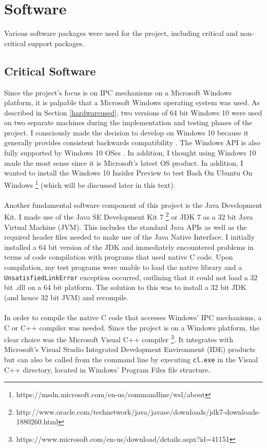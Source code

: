 \documentclass[12pt] {newrucsthesis}    %
\def\code#1{\texttt{#1}}
\begin{document}
    \section{Software} \label{softwareused}%
      Various software packages were used for the project, including critical and
      non-critical support packages.
        \subsection{Critical Software}
          Since the project's focus is on IPC mechanisms on a Microsoft Windows
          platform, it is palpable that a Microsoft Windows operating system was used. As described in
          Section \ref{hardwareused}, two versions of 64 bit Windows 10 were used on two separate
          machines during the implementation and testing phases of the project. I consciously made
          the decision to develop on Windows 10 because it generally provides
          consistent backwards compatibility \citep{win10BC}. The Windows API is also fully supported
          by Windows 10 OSes \citep{MSDN_API}. In addition, I thought using Windows 10 made the most sense
          since it is Microsoft's latest OS product. In addition, I wanted to install the Windows 10 Insider Preview
          to test Bash On Ubuntu On Windows \footnote{https://msdn.microsoft.com/en-us/commandline/wsl/about} (which will be discussed later in this text).
          \\\\
          Another fundamental software component of this project is the Java Development Kit. I made
          use of the Java SE Development Kit 7 \footnote{http://www.oracle.com/technetwork/java/javase/downloads/jdk7-downloads-1880260.html} or JDK 7 as a 32 bit Java Virtual Machine (JVM).
          This includes the standard Java APIs as well as the required header files needed to
          make use of the Java Native Interface. I initially installed a 64 bit version of the JDK and
          immediately encountered problems in terms of code compilation with programs that used native
          C code. Upon compilation, my test programs were unable to load the native library and a
          \code{UnsatisfiedLinkError} exception occurred, outlining that it could not load a 32 bit .dll
          on a 64 bit platform. The solution to this was to install a 32 bit JDK (and hence 32 bit
          JVM) and recompile.
          \\\\
          In order to compile the native C code that accesses Windows' IPC mechanisms, a C or C++
          compiler was needed. Since the project is on a Windows platform, the clear choice was the
          Microsoft Visual C++ compiler \footnote{https://www.microsoft.com/en-us/download/details.aspx?id=41151}.
          It integrates with Microsoft's Visual Studio Integrated
          Development Environment (IDE) products but can also be called from the command line by
          executing \code{cl.exe} in the Visual C++ directory, located in Windows' Program Files file structure.
\end{document}
